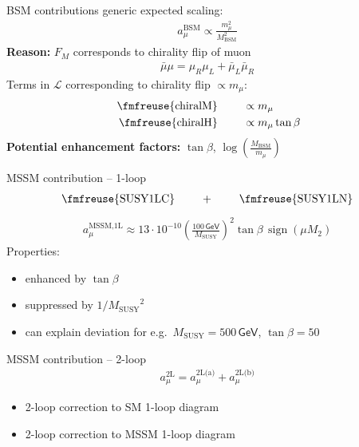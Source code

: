 \documentclass[hyperref={pdfpagelabels=false},ngerman]{beamer}
\newcommand{\fmfvcenter}[1]{\;\vcenter{\hbox{\fmfreuse{#1}}}\;}
\newcommand{\eh}[1]{\,\mathsf{#1}}
\DeclareMathOperator{\sign}{sign}
\renewcommand{\emph}{\textbf}
\newcommand{\MSSM}{\ensuremath{\text{MSSM}}}
\newcommand{\MS}{\ensuremath{M_\text{SUSY}}}
\newcommand{\amu}{a_\mu}
\newcommand{\amuMSSMOneL}{\amu^{\MSSM,\text{1L}}}
\newcommand{\amuMSSMTwoL}{\amu^{\text{2L}}}
\newcommand{\amuMSSMTwoLa}{\amu^{\text{2L(a)}}}
\newcommand{\amuMSSMTwoLb}{\amu^{\text{2L(b)}}}
\begin{document}
\begin{frame}{BSM contributions}
  generic expected scaling:
  \begin{align*}
    a_\mu^\text{BSM} \propto \frac{m_\mu^2}{M_\text{BSM}^2}
  \end{align*}
  \emph{Reason:} $F_M$ corresponds to chirality flip of muon
  \begin{align*}
    \bar{\mu}\mu = \mu_R \mu_L + \bar{\mu}_L \bar{\mu}_R
  \end{align*}
  Terms in $\mathcal{L}$ corresponding to chirality flip $\propto m_\mu$:
  \begin{align*}
    \fmfvcenter{chiralM} &\qquad\propto m_\mu \\
    \fmfvcenter{chiralH} &\qquad\propto m_\mu \tan\beta
  \end{align*}
  \emph{Potential enhancement factors:}
  $\tan\beta$, $\log\left(\frac{M_\text{BSM}}{m_\mu}\right)$
\end{frame}

\begin{frame}{MSSM contribution -- 1-loop}
  \begin{align*}
    \fmfvcenter{SUSY1LC} \qquad + \qquad \fmfvcenter{SUSY1LN}
  \end{align*}
  \begin{align*}
    \amuMSSMOneL \approx 13\cdot 10^{-10} \left(\frac{100\eh{GeV}}{\MS}\right)^2 \tan\beta\, \sign(\mu M_2)
  \end{align*}
  Properties:
  \begin{itemize}
  \item enhanced by $\tan\beta$
  \item suppressed by $1/\MS^2$
  \item can explain deviation for e.g.\ $\MS = 500\eh{GeV}$, $\tan\beta = 50$
  \end{itemize}
\end{frame}

\begin{frame}{MSSM contribution -- 2-loop}
  \begin{align*}
    \amuMSSMTwoL = \amuMSSMTwoLa + \amuMSSMTwoLb
  \end{align*}
  \begin{itemize}
  \item 2-loop correction to SM 1-loop diagram
  \item 2-loop correction to MSSM 1-loop diagram
  \end{itemize}
\end{frame}
\end{document}
